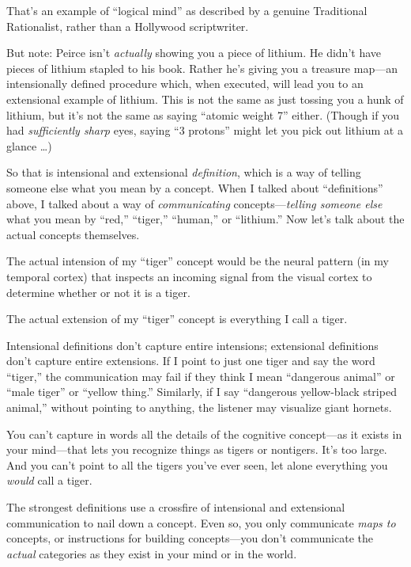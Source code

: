 {
 That's an example of ``logical
mind'' as described by a genuine Traditional
Rationalist, rather than a Hollywood scriptwriter.}

{
 But note: Peirce isn't \textit{actually} showing
you a piece of lithium. He didn't have pieces of
lithium stapled to his book. Rather he's giving you a
treasure map---an intensionally defined procedure which, when executed,
will lead you to an extensional example of lithium. This is not the
same as just tossing you a hunk of lithium, but it's
not the same as saying ``atomic weight
7'' either. (Though if you had \textit{sufficiently
sharp} eyes, saying ``3 protons''
might let you pick out lithium at a glance \ldots)}

{
 So that is intensional and extensional \textit{definition}, which
is a way of telling someone else what you mean by a concept. When I
talked about ``definitions'' above,
I talked about a way of \textit{communicating}
concepts---\textit{telling someone else} what you mean by
``red,''
``tiger,''
``human,'' or
``lithium.'' Now
let's talk about the actual concepts themselves.}

{
 The actual intension of my
``tiger'' concept would be the
neural pattern (in my temporal cortex) that inspects an incoming signal
from the visual cortex to determine whether or not it is a tiger.}

{
 The actual extension of my
``tiger'' concept is everything I
call a tiger.}

{
 Intensional definitions don't capture entire
intensions; extensional definitions don't capture
entire extensions. If I point to just one tiger and say the word
``tiger,'' the communication may
fail if they think I mean ``dangerous
animal'' or ``male
tiger'' or ``yellow
thing.'' Similarly, if I say
``dangerous yellow-black striped
animal,'' without pointing to anything, the listener
may visualize giant hornets.}

{
 You can't capture in words all the details of the
cognitive concept---as it exists in your mind---that lets you recognize
things as tigers or nontigers. It's too large. And you
can't point to all the tigers you've
ever seen, let alone everything you \textit{would} call a tiger.}

{
 The strongest definitions use a crossfire of intensional and
extensional communication to nail down a concept. Even so, you only
communicate \textit{maps to} concepts, or instructions for building
concepts---you don't communicate the \textit{actual}
categories as they exist in your mind or in the world.}

